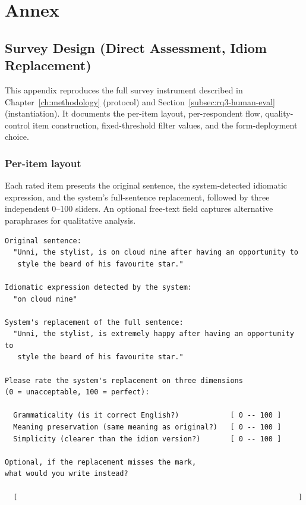 \section{Annex}

\subsection{Survey Design (Direct Assessment, Idiom Replacement)}
\label{appendix:survey-design}

This appendix reproduces the full survey instrument described in Chapter~\ref{ch:methodology} (protocol) and Section~\ref{subsec:rq3-human-eval} (instantiation). It documents the per-item layout, per-respondent flow, quality-control item construction, fixed-threshold filter values, and the form-deployment choice.

\subsubsection{Per-item layout}

Each rated item presents the original sentence, the system-detected idiomatic expression, and the system's full-sentence replacement, followed by three independent 0--100 sliders. An optional free-text field captures alternative paraphrases for qualitative analysis.

\begin{verbatim}
Original sentence:
  "Unni, the stylist, is on cloud nine after having an opportunity to
   style the beard of his favourite star."

Idiomatic expression detected by the system:
  "on cloud nine"

System's replacement of the full sentence:
  "Unni, the stylist, is extremely happy after having an opportunity to
   style the beard of his favourite star."

Please rate the system's replacement on three dimensions
(0 = unacceptable, 100 = perfect):

  Grammaticality (is it correct English?)            [ 0 -- 100 ]
  Meaning preservation (same meaning as original?)   [ 0 -- 100 ]
  Simplicity (clearer than the idiom version?)       [ 0 -- 100 ]

Optional, if the replacement misses the mark,
what would you write instead?

  [                                                                  ]
\end{verbatim}


